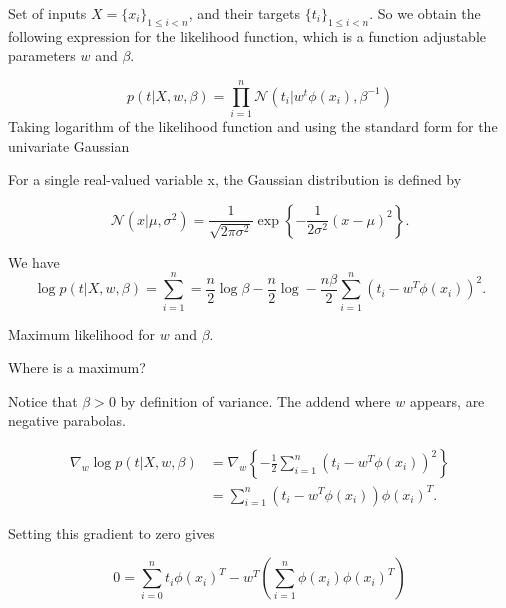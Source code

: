   \begin{frame}
    Set of inputs $X = \{x_i\}_{1\leq i < n}$, and their targets $\{ t_i\}_{1\leq i < n}$. 
    So we obtain the following expression for the likelihood function, which is a function adjustable parameters $w$ and $\beta$. 
  
    \begin{equation}
      p (t | X, w, \beta) = 
      \prod^{n}_{i=1} 
      \mathcal{N}(t_i | w^t \phi(x_i), \beta^{-1})
    \end{equation}
    Taking logarithm of the likelihood function and using the standard form for the univariate Gaussian
  \end{frame}
  \begin{frame}
    For a single real-valued variable x, the Gaussian distribution is defined by
  
    \begin{equation}
      \mathcal{N}(x | \mu, \sigma^2) 
      = 
      \frac{1}{\sqrt{2 \pi \sigma^2}}
      \exp 
      \left\{
        - \frac{1}{2 \sigma^2} (x - \mu)^2
      \right\}. 
    \end{equation}
  
    We have
    \begin{equation}
      \log p(t|X,w, \beta) 
      =
      \sum^n_{i=1}
      = \frac{n}{2} \log \beta 
      - \frac{n}{2} \log  
      - \frac{n \beta}{2} 
      \sum_{i = 1}^n
      (t_i - w^T \phi(x_i))^2.
    \end{equation}
  
    Maximum likelihood for $w$ and $\beta$.
  
    Where is a maximum? 
  
    Notice that $\beta > 0$ by definition of variance. 
    The addend where $w$ appears,  are negative parabolas. 
  \end{frame}
  
  \begin{frame}
    \begin{align}
      \nabla_w \log p(t|X,w, \beta) 
      &= 
      \nabla_w 
      \left\{ 
        - \frac{1}{2} 
        \sum_{i = 1}^n
        (t_i - w^T \phi(x_i))^2
      \right\}
      \\
      &= 
      \sum _{i=1}^n
      (t_i - w^T \phi(x_i))
      \phi(x_i)^T.
    \end{align}
  
    Setting this gradient to zero gives 
  
    \begin{equation}
      0 
      = 
      \sum_{i = 0}^n
      t_i \phi(x_i)^T
      - 
      w^T
      \left(
        \sum_{i=1}^n
        \phi(x_i)
        \phi(x_i)^T
      \right)
    \end{equation}
  \end{frame}
  

